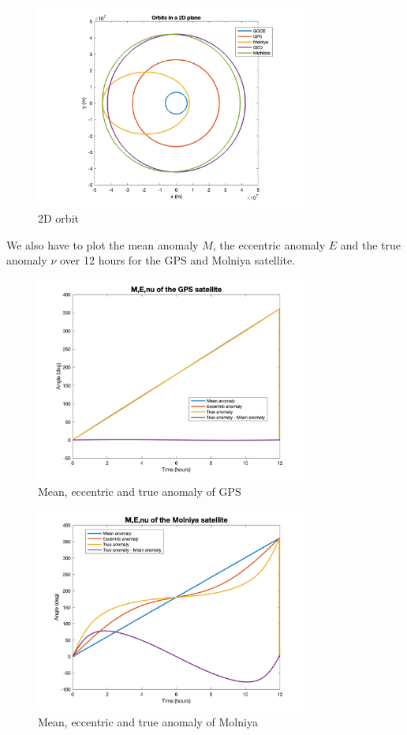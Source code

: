 \documentclass[12pt
,headinclude
,headsepline
,bibtotocnumbered
]{scrartcl}
\begin{document}
\begin{figure}[H]
    \centering
    \includegraphics[width=0.8\textwidth]{plots/orb2d.png}
    \caption{2D orbit}
    \label{fig:2D_orbit}
\end{figure}
We also have to plot the mean anomaly $M$, the eccentric anomaly $E$ and the true anomaly $\nu$ over 12 hours for the GPS and Molniya satellite.
\begin{figure}[H]
    \centering
    \includegraphics[width=0.8\textwidth]{plots/MG.png}
    \caption{Mean, eccentric and true anomaly of GPS}
    \end{figure}
\begin{figure}[H]
    \centering
    \includegraphics[width=0.8\textwidth]{plots/MM.png}
    \caption{Mean, eccentric and true anomaly of Molniya}
\end{figure}
\end{document}
